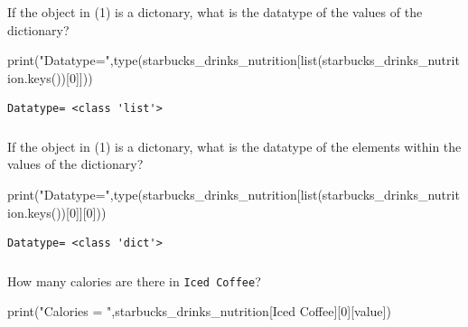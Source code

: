 \documentclass[
  letterpaper,
  DIV=11,
  numbers=noendperiod]{scrreprt}
\newenvironment{Shaded}{\begin{snugshade}}{\end{snugshade}}
\newcommand{\BuiltInTok}[1]{\textcolor[rgb]{0.00,0.23,0.31}{#1}}
\newcommand{\DecValTok}[1]{\textcolor[rgb]{0.68,0.00,0.00}{#1}}
\newcommand{\NormalTok}[1]{\textcolor[rgb]{0.00,0.23,0.31}{#1}}
\newcommand{\StringTok}[1]{\textcolor[rgb]{0.13,0.47,0.30}{#1}}
\begin{document}
If the object in (1) is a dictonary, what is the datatype of the values
of the dictionary?

\begin{Shaded}
\begin{Highlighting}[]
\BuiltInTok{print}\NormalTok{(}\StringTok{"Datatype="}\NormalTok{,}\BuiltInTok{type}\NormalTok{(starbucks\_drinks\_nutrition[}\BuiltInTok{list}\NormalTok{(starbucks\_drinks\_nutrition.keys())[}\DecValTok{0}\NormalTok{]]))}
\end{Highlighting}
\end{Shaded}

\begin{verbatim}
Datatype= <class 'list'>
\end{verbatim}

\hypertarget{section-12}{%
\subsubsection{}\label{section-12}}

If the object in (1) is a dictonary, what is the datatype of the
elements within the values of the dictionary?

\begin{Shaded}
\begin{Highlighting}[]
\BuiltInTok{print}\NormalTok{(}\StringTok{"Datatype="}\NormalTok{,}\BuiltInTok{type}\NormalTok{(starbucks\_drinks\_nutrition[}\BuiltInTok{list}\NormalTok{(starbucks\_drinks\_nutrition.keys())[}\DecValTok{0}\NormalTok{]][}\DecValTok{0}\NormalTok{]))}
\end{Highlighting}
\end{Shaded}

\begin{verbatim}
Datatype= <class 'dict'>
\end{verbatim}

\hypertarget{section-13}{%
\subsubsection{}\label{section-13}}

How many calories are there in \texttt{Iced\ Coffee}?

\begin{Shaded}
\begin{Highlighting}[]
\BuiltInTok{print}\NormalTok{(}\StringTok{"Calories = "}\NormalTok{,starbucks\_drinks\_nutrition[}\StringTok{\textquotesingle{}Iced Coffee\textquotesingle{}}\NormalTok{][}\DecValTok{0}\NormalTok{][}\StringTok{\textquotesingle{}value\textquotesingle{}}\NormalTok{])}
\end{Highlighting}
\end{Shaded}
\end{document}
